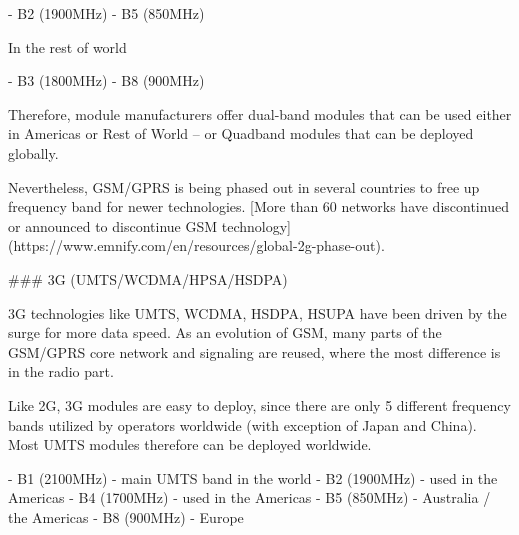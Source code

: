 \documentclass[11pt, oneside]{article}   	%
\newcommand{\addspace}{\vspace{2mm}}
\begin{document}
\addspace
\begin{markdown}
- B2 (1900MHz)
- B5 (850MHz)
\end{markdown}
\addspace
\begin{markdown}
In the rest of world
\end{markdown}
\addspace
\begin{markdown}
- B3 (1800MHz)
- B8 (900MHz)
\end{markdown}
\addspace
\begin{markdown}
Therefore, module manufacturers offer dual-band modules that can be used either in Americas or Rest of World -- or Quadband modules that can be deployed globally.

Nevertheless, GSM/GPRS is being phased out in several countries to free up frequency band for newer technologies.
[More than 60 networks have discontinued or announced to discontinue GSM technology](https://www.emnify.com/en/resources/global-2g-phase-out).

### 3G (UMTS/WCDMA/HPSA/HSDPA)

3G technologies like UMTS, WCDMA, HSDPA, HSUPA have been driven by the surge for more data speed.
As an evolution of GSM, many parts of the GSM/GPRS core network and signaling are reused, where the most difference is in the radio part.

Like 2G, 3G modules are easy to deploy, since there are only 5 different frequency bands utilized by operators worldwide (with exception of Japan and China).
Most UMTS modules therefore can be deployed worldwide.
\end{markdown}
\addspace
\begin{markdown}
- B1 (2100MHz) - main UMTS band in the world
- B2 (1900MHz) - used in the Americas
- B4 (1700MHz) - used in the Americas
- B5 (850MHz) - Australia / the Americas
- B8 (900MHz) - Europe
\end{markdown}
\addspace
\end{document}
